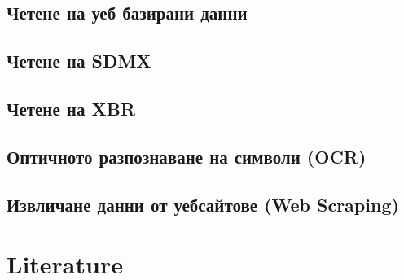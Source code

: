 \documentclass[
]{book}
\begin{document}
\hypertarget{ux447ux435ux442ux435ux43dux435-ux43dux430-ux443ux435ux431-ux431ux430ux437ux438ux440ux430ux43dux438-ux434ux430ux43dux43dux438}{%
\section{Четене на уеб базирани данни}\label{ux447ux435ux442ux435ux43dux435-ux43dux430-ux443ux435ux431-ux431ux430ux437ux438ux440ux430ux43dux438-ux434ux430ux43dux43dux438}}

\hypertarget{ux447ux435ux442ux435ux43dux435-ux43dux430-sdmx}{%
\section{Четене на SDMX}\label{ux447ux435ux442ux435ux43dux435-ux43dux430-sdmx}}

\hypertarget{ux447ux435ux442ux435ux43dux435-ux43dux430-xbr}{%
\section{Четене на XBR}\label{ux447ux435ux442ux435ux43dux435-ux43dux430-xbr}}

\hypertarget{ux43eux43fux442ux438ux447ux43dux43eux442ux43e-ux440ux430ux437ux43fux43eux437ux43dux430ux432ux430ux43dux435-ux43dux430-ux441ux438ux43cux432ux43eux43bux438-ocr}{%
\section{Оптичното разпознаване на символи (OCR)}\label{ux43eux43fux442ux438ux447ux43dux43eux442ux43e-ux440ux430ux437ux43fux43eux437ux43dux430ux432ux430ux43dux435-ux43dux430-ux441ux438ux43cux432ux43eux43bux438-ocr}}

\hypertarget{ux438ux437ux432ux43bux438ux447ux430ux43dux435-ux434ux430ux43dux43dux438-ux43eux442-ux443ux435ux431ux441ux430ux439ux442ux43eux432ux435-web-scraping}{%
\section{Извличане данни от уебсайтове (Web Scraping)}\label{ux438ux437ux432ux43bux438ux447ux430ux43dux435-ux434ux430ux43dux43dux438-ux43eux442-ux443ux435ux431ux441ux430ux439ux442ux43eux432ux435-web-scraping}}

\hypertarget{literature}{%
\chapter{Literature}\label{literature}}
\end{document}
